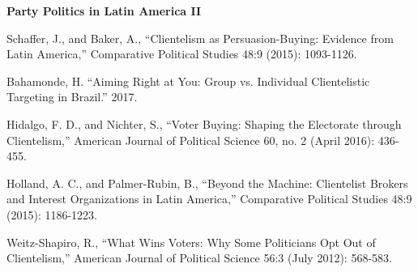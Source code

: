 \documentclass[letterpaper]{article}
\renewenvironment{itemize}{
  \begin{list}{}{
    \setlength{\leftmargin}{1.5em}
  }
}{
  \end{list}
}
\begin{document}
\begin{enumerate}
\item {\bf Party Politics in Latin America II}
	\begin{itemize}
		\item[$\bullet$] Schaffer, J., and Baker, A., ``Clientelism as Persuasion-Buying: Evidence from Latin America,'' Comparative Political Studies 48:9 (2015): 1093-1126.
		\item[$\bullet$] Bahamonde, H. ``Aiming Right at You: Group vs. Individual Clientelistic Targeting in Brazil.'' 2017.
		\item[$\bullet$] Hidalgo, F. D., and Nichter, S., ``Voter Buying: Shaping the Electorate through Clientelism,'' American Journal of Political Science 60, no. 2 (April 2016): 436-455.
		\item[$\bullet$] Holland, A. C., and Palmer-Rubin, B., ``Beyond the Machine: Clientelist Brokers and Interest Organizations in Latin America,'' Comparative Political Studies 48:9 (2015): 1186-1223.
		\item[$\bullet$] Weitz-Shapiro, R., ``What Wins Voters: Why Some Politicians Opt Out of Clientelism,'' American Journal of Political Science 56:3 (July 2012): 568-583.
	\end{itemize}
\end{enumerate}


 









%
%
\end{document}
